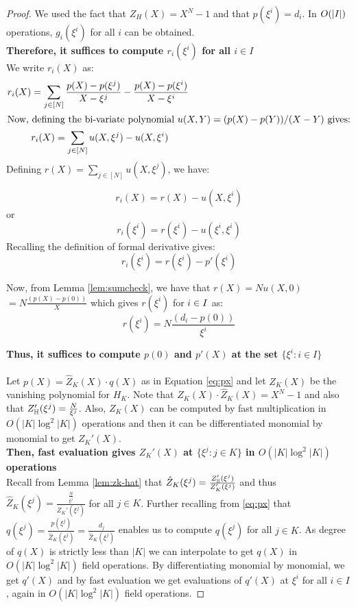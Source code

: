 \begin{proof}
    We used the fact that $Z_H(X)=X^N-1$ and that $p(\xi^i)=d_i$.
    In $O(|I|)$ operations, $g_i(\xi^i)$ for all $i$ can be obtained.\\
    \textbf{Therefore, it suffices to compute $r_i(\xi^i)$ for all $i \in I$}\\
    We write $r_i(X)$ as:
    \begin{align}\label{eq:rx}
    r_i(X) &= \sum_{j\in [N]}\frac{p(X)-p(\xi^j)}{X-\xi^j} - \frac{p(X)-p(\xi^i)}{X-\xi^i} \nonumber \\
    \intertext{Now, defining the bi-variate polynomial $u(X,Y)=(p(X) - p(Y))/(X-Y)$ gives:}
    &r_i(X)= \sum_{j\in [N]}u(X,\xi^j) - u(X,\xi^i) \nonumber
    \end{align}
    Defining $r(X)=\sum_{j\in [N]}u(X,\xi^j)$, we have:

    $$r_i(X)=r(X)-u(X, \xi^i)$$
    or
    $$r_i(\xi^i)=r(\xi^i) - u(\xi^i,\xi^i)$$
    Recalling the definition of formal derivative gives:\\

    $$r_i(\xi^i)=r(\xi^i) - p'(\xi^i) $$


    Now, from Lemma \ref{lem:sumcheck}, we have that $r(X)=N u(X,0)$ \\ 
    $=N \frac{(p(X) - p(0))}{X}$ which gives $r(\xi^i)$ for $i\in I$ as:
    $$r(\xi^i)=N \frac{(d_i - p(0))}{\xi^i}$$

    \textbf{Thus, it suffices to compute $p(0)$ and $p'(X)$ at the set $\{\xi^i:i \in I\}$}\\\\
    Let $p(X)=\widehat{Z}_K(X)\cdot q(X)$
    as in Equation \eqref{eq:px} and let $Z_K(X)$ be the vanishing polynomial for $H_K$.
    Note that $Z_K(X) \cdot \hat{Z}_K(X)=X^N-1$ and also that
    $Z_{\mathbb{H}}'(\xi^j)= \frac{N}{\xi^j} $.
    Also, $Z_K(X)$ can be computed by fast multiplication in $O(|K|\log^2 |K|)$ operations and then it can be differentiated monomial by monomial to get $Z_K'(X)$.\\
    \textbf{Then, fast evaluation gives $Z_K'(X)$ at $\{\xi^j:j\in K\}$ in $O(|K|\log^2 |K|)$ operations}\\
    Recall from Lemma \ref{lem:zk-hat} that $\hat{Z}_K(\xi^j)=\frac{Z_{\mathbb{H}}'(\xi^j)}{Z_K'(\xi^j)}$ and
    thus $\hat{Z}_K(\xi^j)=\frac{\frac{N}{\xi^j}}{Z_K'(\xi^j)}$ for all $j \in K$.
    Further recalling from \eqref{eq:px} that $q(\xi^j)=\frac{p(\xi^j)} {\hat{Z}_K(\xi^j)}=\frac{d_j}{\widehat{Z}_K(\xi^j)}$ enables us to compute
    $q(\xi^j)$ for all $j \in K$.
    As degree of $q(X)$ is strictly less than $|K|$ we can interpolate to get $q(X)$ in $O(|K|\log^2 |K|)$ field operations.
    By differentiating monomial by monomial, we get $q'(X)$ and by fast evaluation we get evaluations of $q'(X)$ at $\xi^i$ for all $i \in I$, again in $O(|K|\log^2 |K|)$ field operations.


\end{proof}
